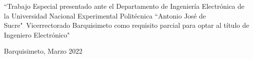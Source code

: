 \begin{table}[t]
\vspace*{3mm}

\parbox[c]{12cm}{
    \begin{center}
        \begin{small}
            ``Trabajo Especial presentado ante el Departamento de Ingeniería
            Electrónica de la Universidad Nacional Experimental Politécnica
            ``Antonio José de Sucre"\ Vicerrectorado  Barquisimeto como requisito
            parcial para optar al título de Ingeniero Electrónico"

        \end{small}
    \end{center}
}

\vspace*{3mm}

\begin{center}Barquisimeto, Marzo  2022\end{center}
\end{table}

